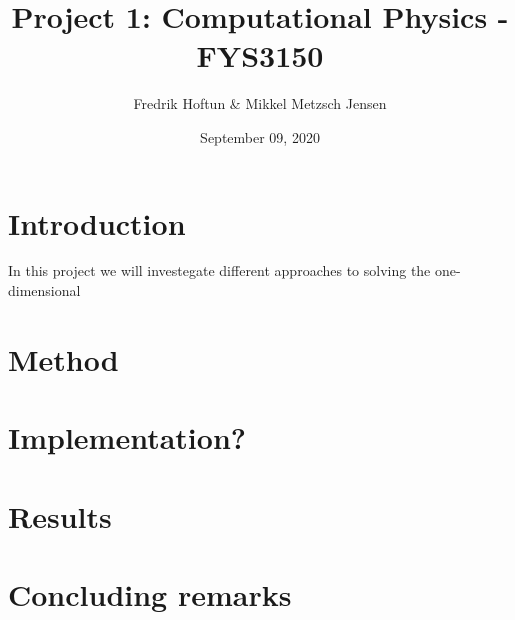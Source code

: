 \documentclass[american,a4paper,12pt]{article}
\title{Project 1: Computational Physics - FYS3150}
\author{Fredrik Hoftun \& Mikkel Metzsch Jensen}
\date{September 09, 2020}
\begin{document}
\maketitle

\section{Introduction}
  In this project we will investegate different approaches to solving the one-dimensional 
\section{Method}
\section{Implementation?}
\section{Results}
\section{Concluding remarks}
\end{document}
